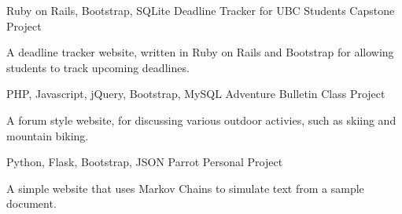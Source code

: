 

\begin{cventries}

  \cventry
    {Ruby on Rails, Bootstrap, SQLite}
    {Deadline Tracker for UBC Students} %
    {Capstone Project} %
    {} %
    {
      \begin{cvitems} %
        \item 
        {
            A deadline tracker website, written in Ruby on Rails and Bootstrap
            for allowing students to track upcoming deadlines.
        }
      \end{cvitems}
    }

  \cventry
    {PHP, Javascript, jQuery, Bootstrap, MySQL} %
    {Adventure Bulletin} %
    {Class Project} %
    {} %
    {
      \begin{cvitems} %
        \item 
        {
            A forum style website, for discussing various outdoor activies, such
            as skiing and mountain biking.
        }
      \end{cvitems}
    }

  \cventry
    {Python, Flask, Bootstrap, JSON} %
    {Parrot} %
    {Personal Project} %
    {} %
    {
      \begin{cvitems} %
        \item 
        {
            A simple website that uses Markov Chains to simulate text from a sample document.
        }
      \end{cvitems}
    }
\end{cventries}
